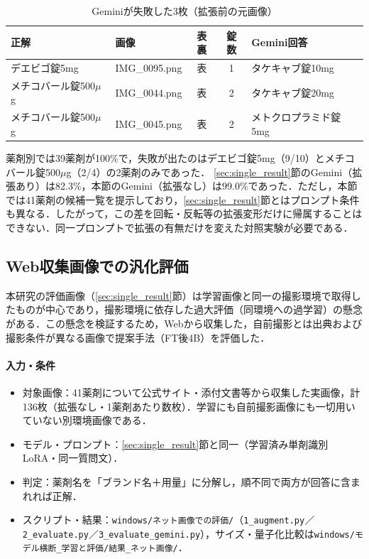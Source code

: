 \documentclass[dvipdfmx]{jsarticle}
\begin{document}
\begin{table}[htbp]
\centering
\caption{Geminiが失敗した3枚（拡張前の元画像）}
\label{tab:gemini_orig_fail}
\small
\begin{tabular}{llccl}
\hline
正解 & 画像 & 表裏 & 錠数 & Gemini回答 \\
\hline
デエビゴ錠5mg & IMG\_0095.png & 表 & 1 & タケキャブ錠10mg \\
メチコバール錠500$\mu$g & IMG\_0044.png & 表 & 2 & タケキャブ錠20mg \\
メチコバール錠500$\mu$g & IMG\_0045.png & 表 & 2 & メトクロプラミド錠5mg \\
\hline
\end{tabular}
\end{table}

薬剤別では39薬剤が100\%で，失敗が出たのはデエビゴ錠5mg（9/10）とメチコバール錠500$\mu$g（2/4）の2薬剤のみであった．
\ref{sec:single_result}節のGemini（拡張あり）は82.3\%，本節のGemini（拡張なし）は99.0\%であった．ただし，本節では41薬剤の候補一覧を提示しており，\ref{sec:single_result}節とはプロンプト条件も異なる．したがって，この差を回転・反転等の拡張変形だけに帰属することはできない．同一プロンプトで拡張の有無だけを変えた対照実験が必要である．

\subsection{Web収集画像での汎化評価}\label{sec:webgen}

本研究の評価画像（\ref{sec:single_result}節）は学習画像と同一の撮影環境で取得したものが中心であり，撮影環境に依存した過大評価（同環境への過学習）の懸念がある．この懸念を検証するため，Webから収集した，自前撮影とは出典および撮影条件が異なる画像で提案手法（FT後4B）を評価した．

\paragraph{入力・条件}
\begin{itemize}
  \item 対象画像：41薬剤について公式サイト・添付文書等から収集した実画像，計136枚（拡張なし・1薬剤あたり数枚）．学習にも自前撮影画像にも一切用いていない別環境画像である．
  \item モデル・プロンプト：\ref{sec:single_result}節と同一（学習済み単剤識別LoRA・同一質問文）．
  \item 判定：薬剤名を「ブランド名＋用量」に分解し，順不同で両方が回答に含まれれば正解．
  \item スクリプト・結果：\texttt{windows/ネット画像での評価/}（\texttt{1\_augment.py}／\texttt{2\_evaluate.py}／\texttt{3\_evaluate\_gemini.py}），サイズ・量子化比較は\texttt{windows/モデル横断\_学習と評価/結果\_ネット画像/}．
\end{itemize}
\end{document}
